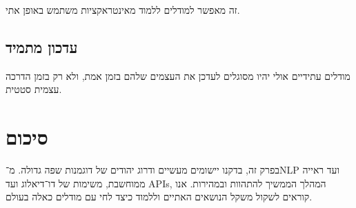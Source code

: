 זה מאפשר למודלים ללמוד מאינטראקציות משתמש באופן אתי.

\subsection{עדכון מתמיד}

מודלים עתידיים אולי יהיו מסוגלים לעדכן את העצמים שלהם בזמן אמת,
ולא רק בזמן הדרכה עצמית סטטית.

\section{סיכום}

בפרק זה, בדקנו יישומים מעשיים ודרוג יהודים של דוגמנות שפה גדולה.
מ־\textenglish{NLP} ועד ראייה ממוחשבת, משימות של דו־דיאלוג ועד \textenglish{API}s,
המהלך הממשיך להתהוות ובמהירות.
אנו קוראים לשקול משקל הנושאים האתיים וללמוד כיצד לחי עם מודלים כאלה בעולם.

